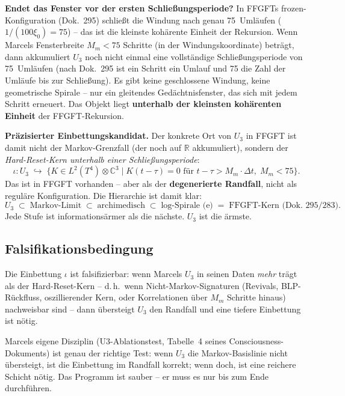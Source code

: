 \textbf{Endet das Fenster vor der ersten Schließungsperiode?} In
FFGFTs frozen-Konfiguration (Dok.~295) schließt die Windung nach genau
75~Umläufen ($1/(100\xi_0) = 75$) -- das ist die kleinste kohärente
Einheit der Rekursion. Wenn Marcels Fensterbreite $M_m < 75$ Schritte
(in der Windungskoordinate) beträgt, dann akkumuliert $U_3$ noch nicht
einmal eine vollständige Schließungsperiode von 75~Umläufen (nach Dok.~295 ist ein Schritt ein Umlauf und 75 die Zahl der Umläufe bis
zur Schließung). Es gibt keine geschlossene Windung,
keine geometrische Spirale -- nur ein gleitendes Gedächtnisfenster, das
sich mit jedem Schritt erneuert. Das Objekt liegt \textbf{unterhalb der
kleinsten kohärenten Einheit} der FFGFT-Rekursion.

\textbf{Präzisierter Einbettungskandidat.} Der konkrete Ort von $U_3$ in
FFGFT ist damit nicht der Markov-Grenzfall (der noch auf $\mathbb{R}$
akkumuliert), sondern der \emph{Hard-Reset-Kern unterhalb einer Schließungsperiode}:
\begin{equation}
  \iota\colon U_3 \;\hookrightarrow\;
  \bigl\{K \in L^2(T^4)\otimes\mathbb{C}^3 \;\big|\;
  K(t-\tau) = 0 \text{ für } t-\tau > M_m\cdot\Delta t,\;
  M_m < 75\bigr\}.
\end{equation}
Das ist in FFGFT vorhanden -- aber als der \textbf{degenerierte Randfall},
nicht als reguläre Konfiguration. Die Hierarchie ist damit klar:
\begin{equation}
  U_3 \;\subset\; \text{Markov-Limit} \;\subset\;
  \text{archimedisch} \;\subset\; \text{log-Spirale (e)}
  \;=\; \text{FFGFT-Kern (Dok.~295/283)}.
\end{equation}
Jede Stufe ist informationsärmer als die nächste. $U_3$ ist die ärmste.

\subsection*{Falsifikationsbedingung}

Die Einbettung $\iota$ ist falsifizierbar: wenn Marcels $U_3$ in seinen
Daten \emph{mehr} trägt als der Hard-Reset-Kern -- d.\,h.\ wenn
Nicht-Markov-Signaturen (Revivals, BLP-Rückfluss, oszillierender Kern,
oder Korrelationen über $M_m$ Schritte hinaus) nachweisbar sind -- dann
übersteigt $U_3$ den Randfall und eine tiefere Einbettung ist nötig.

Marcels eigene Disziplin (U3-Ablationstest, Tabelle~4 seines
Consciousness-Dokuments) ist genau der richtige Test: wenn $U_3$ die
Markov-Basislinie nicht übersteigt, ist die Einbettung im Randfall
korrekt; wenn doch, ist eine reichere Schicht nötig. Das Programm ist
sauber -- er muss es nur bis zum Ende durchführen.

